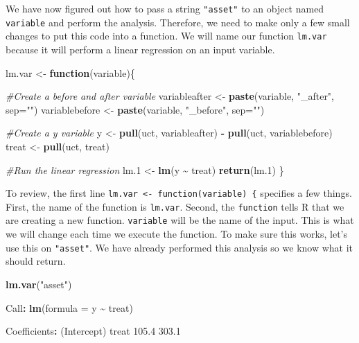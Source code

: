 \documentclass[
]{book}
\newenvironment{Shaded}{\begin{snugshade}}{\end{snugshade}}
\newcommand{\AttributeTok}[1]{\textcolor[rgb]{0.13,0.29,0.53}{#1}}
\newcommand{\CommentTok}[1]{\textcolor[rgb]{0.56,0.35,0.01}{\textit{#1}}}
\newcommand{\ControlFlowTok}[1]{\textcolor[rgb]{0.13,0.29,0.53}{\textbf{#1}}}
\newcommand{\FloatTok}[1]{\textcolor[rgb]{0.00,0.00,0.81}{#1}}
\newcommand{\FunctionTok}[1]{\textcolor[rgb]{0.13,0.29,0.53}{\textbf{#1}}}
\newcommand{\NormalTok}[1]{#1}
\newcommand{\OtherTok}[1]{\textcolor[rgb]{0.56,0.35,0.01}{#1}}
\newcommand{\SpecialCharTok}[1]{\textcolor[rgb]{0.81,0.36,0.00}{\textbf{#1}}}
\newcommand{\StringTok}[1]{\textcolor[rgb]{0.31,0.60,0.02}{#1}}
\begin{document}
We have now figured out how to pass a string \texttt{"asset"} to an object named \texttt{variable} and perform the analysis. Therefore, we need to make only a few small changes to put this code into a function. We will name our function \texttt{lm.var} because it will perform a linear regression on an input variable.

\begin{Shaded}
\begin{Highlighting}[]
\NormalTok{lm.var }\OtherTok{\textless{}{-}} \ControlFlowTok{function}\NormalTok{(variable)\{}
  
  \CommentTok{\#Create a before and after variable}
\NormalTok{  variableafter }\OtherTok{\textless{}{-}} \FunctionTok{paste}\NormalTok{(variable, }\StringTok{"\_after"}\NormalTok{, }\AttributeTok{sep=}\StringTok{""}\NormalTok{)}
\NormalTok{  variablebefore }\OtherTok{\textless{}{-}} \FunctionTok{paste}\NormalTok{(variable, }\StringTok{"\_before"}\NormalTok{, }\AttributeTok{sep=}\StringTok{""}\NormalTok{)}
  
  \CommentTok{\#Create a y variable}
\NormalTok{  y }\OtherTok{\textless{}{-}} \FunctionTok{pull}\NormalTok{(uct, variableafter) }\SpecialCharTok{{-}} \FunctionTok{pull}\NormalTok{(uct, variablebefore)}
\NormalTok{  treat }\OtherTok{\textless{}{-}} \FunctionTok{pull}\NormalTok{(uct, treat)}
  
  \CommentTok{\#Run the linear regression}
\NormalTok{  lm}\FloatTok{.1} \OtherTok{\textless{}{-}} \FunctionTok{lm}\NormalTok{(y }\SpecialCharTok{\textasciitilde{}}\NormalTok{ treat)}
  \FunctionTok{return}\NormalTok{(lm}\FloatTok{.1}\NormalTok{)}
\NormalTok{\}}
\end{Highlighting}
\end{Shaded}

To review, the first line \texttt{lm.var\ \textless{}-\ function(variable)\ \{} specifies a few things. First, the name of the function is \texttt{lm.var}. Second, the \texttt{function} tells R that we are creating a new function. \texttt{variable} will be the name of the input. This is what we will change each time we execute the function. To make sure this works, let's use this on \texttt{"asset"}. We have already performed this analysis so we know what it should return.

\begin{Shaded}
\begin{Highlighting}[]
\FunctionTok{lm.var}\NormalTok{(}\StringTok{"asset"}\NormalTok{)}

\NormalTok{Call}\SpecialCharTok{:}
\FunctionTok{lm}\NormalTok{(}\AttributeTok{formula =}\NormalTok{ y }\SpecialCharTok{\textasciitilde{}}\NormalTok{ treat)}

\NormalTok{Coefficients}\SpecialCharTok{:}
\NormalTok{(Intercept)        treat  }
      \FloatTok{105.4}        \FloatTok{303.1}  
\end{Highlighting}
\end{Shaded}
\end{document}
